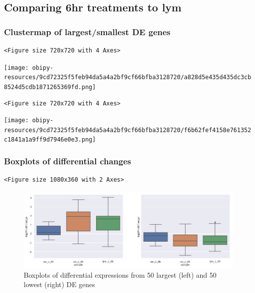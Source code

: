 \documentclass[a4paper]{article}
\begin{document}
\clearpage
\subsection{Comparing 6hr treatments to lym}
\label{sec:org2607aa3}
\subsubsection{Clustermap of largest/smallest DE genes}
\label{sec:org4eb618e}
\begin{verbatim}
<Figure size 720x720 with 4 Axes>
\end{verbatim}

\begin{center}
\texttt{[image: obipy-resources/9cd72325f5feb94da5a4a2bf9cf66bfba3128720/a828d5e435d435dc3cb8524d5cdb1871265369fd.png]}
\end{center}

\begin{verbatim}
<Figure size 720x720 with 4 Axes>
\end{verbatim}

\begin{center}
\texttt{[image: obipy-resources/9cd72325f5feb94da5a4a2bf9cf66bfba3128720/f6b62fef4158e761352c1841a1a9ff9d7946e0e3.png]}
\end{center}


\subsubsection{Boxplots of differential changes}
\label{sec:orgafd91a7}

\begin{verbatim}
<Figure size 1080x360 with 2 Axes>
\end{verbatim}

\begin{figure}[htbp]
\centering
\includegraphics[width=.9\linewidth]{obipy-resources/pairings_6hr_lym_boxplots.png}
\caption{\label{pairings_6hr_lym_boxplots}
Boxplots of differential expressions from 50 largest (left) and 50 lowest (right) DE genes}
\end{figure}
\end{document}
